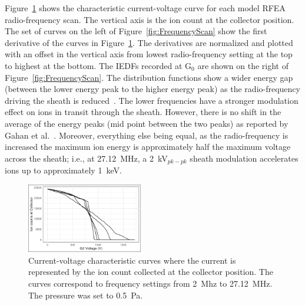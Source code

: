 Figure~\ref{fig:IVcurve_FrequencyScan} shows the characteristic current-voltage curve for each model RFEA radio-frequency scan. The vertical axis is the ion count at the collector position. The set of curves on the left of Figure~\ref{fig:FrequencyScan} show the first derivative of the curves in Figure~\ref{fig:IVcurve_FrequencyScan}. The derivatives are normalized and plotted with an offset in the vertical axis from lowest radio-frequency setting at the top to highest at the bottom. The IEDFs recorded at G$_0$ are shown on the right of Figure~\ref{fig:FrequencyScan}. The distribution functions show a wider energy gap (between the lower energy peak to the higher energy peak) as the radio-frequency driving the sheath is reduced~\cite{Lieberman2005}. The lower frequencies have a stronger modulation effect on ions in transit through the sheath. However, there is no shift in the average of the energy peaks (mid point between the two peaks) as reported by Gahan et al.~\cite{Gahan2008}. Moreover, everything else being equal, as the radio-frequency is increased the maximum ion energy is approximately half the maximum voltage across the sheath; i.e., at 27.12~MHz, a 2~kV$_{pk-pk}$ sheath modulation accelerates ions up to approximately 1~keV.  

\begin{figure}[htbp]
\centering
\includegraphics[width=0.45\textwidth]{Figures/IVcurve_FrequencyScan.jpeg}
\caption{Current-voltage characteristic curves where the current is represented by the ion count collected at the collector position. The curves correspond to frequency settings from 2~Mhz to 27.12~MHz. The pressure was set to 0.5~Pa. }
\label{fig:IVcurve_FrequencyScan}
\end{figure}

